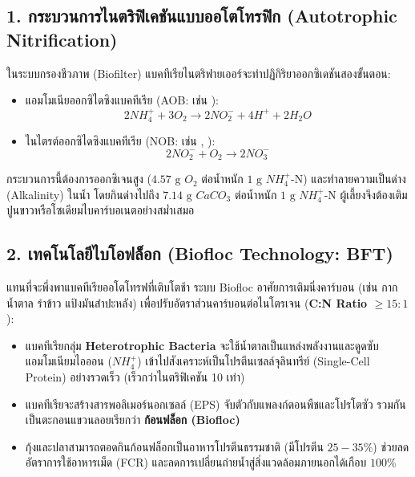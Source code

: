 \subsection{1. กระบวนการไนตริฟิเคชันแบบออโตโทรฟิก (Autotrophic Nitrification)}
ในระบบกรองชีวภาพ (Biofilter) แบคทีเรียไนตริฟายเออร์จะทำปฏิกิริยาออกซิเดชันสองขั้นตอน:
\begin{itemize}
    \item แอมโมเนียออกซิไดซิงแบคทีเรีย (AOB: เช่น ):
    $$2 NH_4^+ + 3 O_2 \longrightarrow 2 NO_2^- + 4 H^+ + 2 H_2O$$
    \item ไนไตรต์ออกซิไดซิงแบคทีเรีย (NOB: เช่น , ):
    $$2 NO_2^- + O_2 \longrightarrow 2 NO_3^-$$
\end{itemize}
กระบวนการนี้ต้องการออกซิเจนสูง ($4.57\text{ g } O_2$ ต่อน้ำหนัก $1\text{ g } NH_4^+$-N) และทำลายความเป็นด่าง (Alkalinity) ในน้ำ โดยกินด่างไปถึง $7.14\text{ g } CaCO_3$ ต่อน้ำหนัก $1\text{ g } NH_4^+$-N ผู้เลี้ยงจึงต้องเติมปูนขาวหรือโซเดียมไบคาร์บอเนตอย่างสม่ำเสมอ

\subsection{2. เทคโนโลยีไบโอฟล็อก (Biofloc Technology: BFT)}
แทนที่จะพึ่งพาแบคทีเรียออโตโทรฟที่เติบโตช้า ระบบ Biofloc อาศัยการเติมนิ่งคาร์บอน (เช่น กากน้ำตาล รำข้าว แป้งมันสำปะหลัง) เพื่อปรับอัตราส่วนคาร์บอนต่อไนโตรเจน (\textbf{C:N Ratio $\ge 15:1$}):
\begin{itemize}
    \item แบคทีเรียกลุ่ม \textbf{Heterotrophic Bacteria} จะใช้น้ำตาลเป็นแหล่งพลังงานและดูดซับแอมโมเนียมไอออน ($NH_4^+$) เข้าไปสังเคราะห์เป็นโปรตีนเซลล์จุลินทรีย์ (Single-Cell Protein) อย่างรวดเร็ว (เร็วกว่าไนตริฟิเคชัน 10 เท่า)
    \item แบคทีเรียจะสร้างสารพอลิเมอร์นอกเซลล์ (EPS) จับตัวกับแพลงก์ตอนพืชและโปรโตซัว รวมกันเป็นตะกอนแขวนลอยเรียกว่า \textbf{ก้อนฟล็อก (Biofloc)}
    \item กุ้งและปลาสามารถตอดกินก้อนฟล็อกเป็นอาหารโปรตีนธรรมชาติ (มีโปรตีน $25 - 35\%$) ช่วยลดอัตราการใช้อาหารเม็ด (FCR) และลดการเปลี่ยนถ่ายน้ำสู่สิ่งแวดล้อมภายนอกได้เกือบ $100\%$
\end{itemize}

